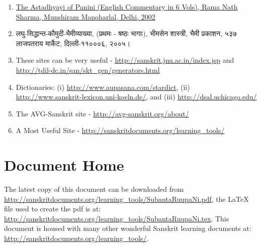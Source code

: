 \documentclass[leqno,fleqn,12pt]{article}%
\newenvironment{ewosp}{\begin{enumerate} \setlength{\itemsep}{0mm}
    \setlength{\parskip}{0mm}}{\end{enumerate}}
\begin{document}
\begin{ewosp}
\item \href{https://archive.org/details/TheAshtadhyayiOfPanini-RamNathSharma}{The Astadhyayi of Panini (English Commentary in 6 Vols), Rama Nath Sharma, Munshiram Manoharlal, Delhi, 2002} 
\item लघु-सिद्धान्त-कौमुदी-भैमीव्याख्या, (प्रथमः - षष्ठः भागाः), भीमसेन शास्त्री, भैमी प्रकाशन, ५३७ लाजपतराय मार्केट, दिल्ली-११०००६, २००५।
\item These sites can be very useful - \url{http://sanskrit.jnu.ac.in/index.jsp} and \url{http://tdil-dc.in/san/skt_gen/generators.html}
\item Dictionaries: (i) \url{http://www.aupasana.com/stardict}, (ii) \url{http://www.sanskrit-lexicon.uni-koeln.de/}, and (iii) \url{http://dsal.uchicago.edu/}
\item The AVG-Sanskrit site - \url{http://avg-sanskrit.org/about/}
\item A Most Useful Site - \url{http://sanskritdocuments.org/learning_tools/}
\end{ewosp}

\section{Document Home}
The latest copy of this document can be downloaded from \url{http://sanskritdocuments.org/learning_tools/SubantaRuupaNi.pdf}, the \LaTeX{} file used to create the pdf is at: \url{http://sanskritdocuments.org/learning_tools/SubantaRuupaNi.tex}. This document is housed with many other wonderful Sanskrit learning documents at: \url{http://sanskritdocuments.org/learning_tools/}.
\end{document}
